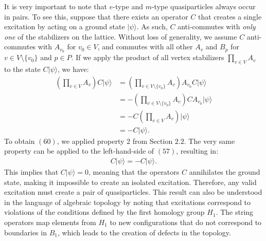 \documentclass[12pt]{article}
\theoremstyle{definition}
\begin{document}
It is very important to note that $e$-type and $m$-type quasiparticles always occur in pairs. To see this, suppose that there exists an operator $C$ that creates a single excitation by acting on a ground state $|\psi\rangle$. As such, $C$ anti-commutes with \emph{only one} of the stabilizers on the lattice. Without loss of generality, we assume $C$ anti-commutes with $A_{v_0}$ for $v_0\in V$, and commutes with all other $A_v$ and $B_p$ for $v\in V\setminus\{v_0\}$ and $p\in P$. If we apply the product of all vertex stabilizers $\prod_{v\in V} A_v$ to the state $C|\psi\rangle$, we have:
    \begin{align}
        (\prod_{v\in V}A_v)C|\psi\rangle &= (\prod_{v\in V\setminus\{v_0\}}A_v)A_{v_0}C|\psi\rangle\\
        &= -(\prod_{v\in V\setminus\{v_0\}}A_v)CA_{v_0}|\psi\rangle\\
        &= -C(\prod_{v\in V}A_v)|\psi\rangle\\
        &= -C|\psi\rangle.
    \end{align}
To obtain $(60)$, we applied property 2 from Section $2.2$. The very same property can be applied to the left-hand-side of $(57)$, resulting in:
    \begin{align}
        C|\psi\rangle = -C|\psi\rangle.
    \end{align}
This implies that $C|\psi\rangle = 0$, meaning that the operators $C$ annihilates the ground state, making it impossible to create an isolated excitation. Therefore, any valid excitation must create a pair of quasiparticles. This result can also be understood in the language of algebraic topology by noting that excitations correspond to violations of the conditions defined by the first homology group $H_1$. The string operators map elements from $H_1$ to new configurations that do not correspond to boundaries in $B_1$, which leads to the creation of defects in the topology.
\end{document}
